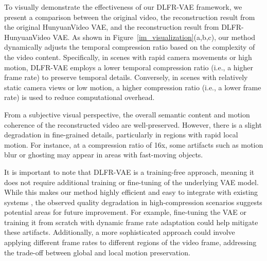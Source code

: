 
To visually demonstrate the effectiveness of our DLFR-VAE framework, we present a comparison between the original video, the reconstruction result from the original HunyuanVideo VAE, and the reconstruction result from DLFR-HunyuanVideo VAE. As shown in Figure~\ref{im_visualization}(a,b,c), our method dynamically adjusts the temporal compression ratio based on the complexity of the video content. Specifically, in scenes with rapid camera movements or high motion, DLFR-VAE employs a lower temporal compression ratio (i.e., a higher frame rate) to preserve temporal details. Conversely, in scenes with relatively static camera views or low motion, a higher compression ratio (i.e., a lower frame rate) is used to reduce computational overhead.

From a subjective visual perspective, the overall semantic content and motion coherence of the reconstructed video are well-preserved. However, there is a slight degradation in fine-grained details, particularly in regions with rapid local motion. For instance, at a compression ratio of 16x, some artifacts such as motion blur or ghosting may appear in areas with fast-moving objects.

It is important to note that DLFR-VAE is a training-free approach, meaning it does not require additional training or fine-tuning of the underlying VAE model. While this makes our method highly efficient and easy to integrate with existing systems \cite{kong2024hunyuanvideo, zheng2024open}, the observed quality degradation in high-compression scenarios suggests potential areas for future improvement. For example, fine-tuning the VAE or training it from scratch with dynamic frame rate adaptation could help mitigate these artifacts. Additionally, a more sophisticated approach could involve applying different frame rates to different regions of the video frame, addressing the trade-off between global and local motion preservation.


